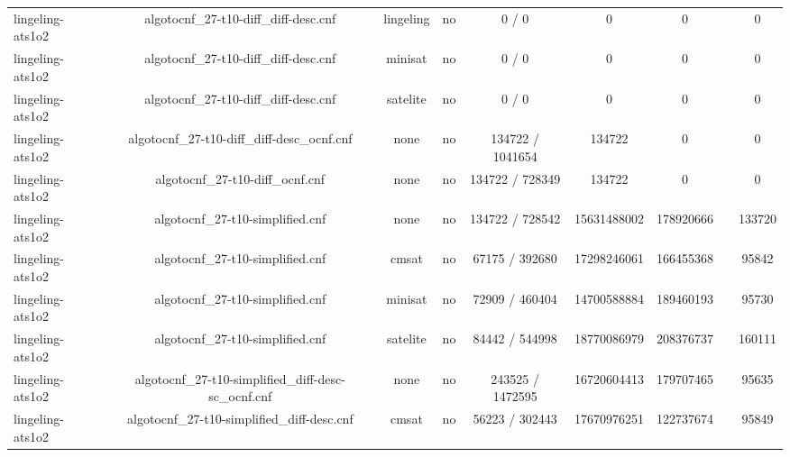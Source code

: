\begin{appendices}
\begin{table}[p]
\begin{center}
\begin{tabular}{l|cccccccc}
  lingeling-ats1o2               & algotocnf\_27-t10-diff\_diff-desc.cnf & lingeling  & no    & 0 / 0      & 0         & 0         &            & 0 \\ %
  lingeling-ats1o2               & algotocnf\_27-t10-diff\_diff-desc.cnf & minisat    & no    & 0 / 0      & 0         & 0         &            & 0 \\ %
  lingeling-ats1o2               & algotocnf\_27-t10-diff\_diff-desc.cnf & satelite   & no    & 0 / 0      & 0         & 0         &            & 0 \\ %
  lingeling-ats1o2               & algotocnf\_27-t10-diff\_diff-desc\_ocnf.cnf & none       & no    & 134722 / 1041654 & 134722    & 0         &            & 0 \\ %
  lingeling-ats1o2               & algotocnf\_27-t10-diff\_ocnf.cnf & none       & no    & 134722 / 728349 & 134722    & 0         &            & 0 \\ %
  lingeling-ats1o2               & algotocnf\_27-t10-simplified.cnf & none       & no    & 134722 / 728542 & 15631488002 & 178920666 &            & 133720 \\ %
  lingeling-ats1o2               & algotocnf\_27-t10-simplified.cnf & cmsat      & no    & 67175 / 392680 & 17298246061 & 166455368 &            & 95842 \\ %
  lingeling-ats1o2               & algotocnf\_27-t10-simplified.cnf & minisat    & no    & 72909 / 460404 & 14700588884 & 189460193 &            & 95730 \\ %
  lingeling-ats1o2               & algotocnf\_27-t10-simplified.cnf & satelite   & no    & 84442 / 544998 & 18770086979 & 208376737 &            & 160111 \\ %
  lingeling-ats1o2               & algotocnf\_27-t10-simplified\_diff-desc-sc\_ocnf.cnf & none       & no    & 243525 / 1472595 & 16720604413 & 179707465 &            & 95635 \\ %
  lingeling-ats1o2               & algotocnf\_27-t10-simplified\_diff-desc.cnf & cmsat      & no    & 56223 / 302443 & 17670976251 & 122737674 &            & 95849 \\ %

\end{tabular}
\end{center}
\end{table}
\end{appendices}
